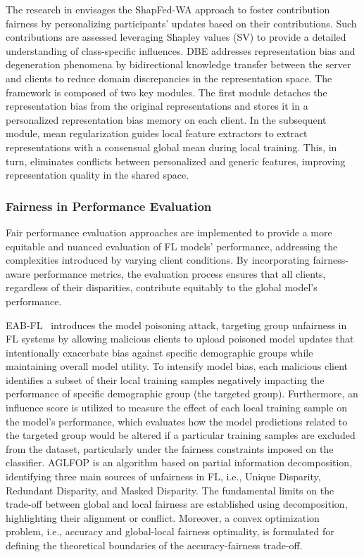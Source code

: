 \documentclass{article}
\begin{document}
The research in \cite{IJCAI_Shapley} envisages the ShapFed-WA approach to foster contribution fairness by personalizing participants' updates based on their contributions. Such contributions are assessed leveraging Shapley values (SV) to provide a detailed understanding of class-specific influences. DBE \cite{NEURIPS2023_2e0d3c6a} addresses representation bias and degeneration phenomena by bidirectional knowledge transfer between the server and clients to reduce domain discrepancies in the representation space. The framework is composed of two key modules. The first module detaches the representation bias from the original representations and stores it in a personalized representation bias memory on each client. In the subsequent module, mean regularization guides local feature extractors to extract representations with a consensual global mean during local training. This, in turn, eliminates conflicts between personalized and generic features, improving representation quality in the shared space.

\subsubsection{Fairness in Performance Evaluation}
\label{Sub_sec: Fairness in Performance Evaluation}
Fair performance evaluation approaches are implemented to provide a more equitable and nuanced evaluation of FL models' performance, addressing the complexities introduced by varying client conditions. By incorporating fairness-aware performance metrics, the evaluation process ensures that all clients, regardless of their disparities, contribute equitably to the global model's performance.

EAB-FL~\cite{ijcai2024_EABFL} introduces the model poisoning attack, targeting group unfairness in FL systems by allowing malicious clients to upload poisoned model updates that intentionally exacerbate bias against specific demographic groups while maintaining overall model utility. To intensify model bias, each malicious client identifies a subset of their local training samples negatively impacting the performance of specific demographic group (the targeted group). Furthermore, an influence score is utilized to measure the effect of each local training sample on the model’s performance, which evaluates how the model predictions related to the targeted group would be altered if a particular training samples are excluded from the dataset, particularly under the fairness constraints imposed on the classifier.
AGLFOP \cite{hamman2024demystifying_ICLR24} 
is an algorithm based on partial information decomposition, identifying three main sources of unfairness in FL, i.e., Unique Disparity, Redundant Disparity, and Masked Disparity. The fundamental limits on the trade-off between global and local fairness 
are established using decomposition, highlighting their alignment or conflict. Moreover, a convex optimization problem, i.e., accuracy and global-local fairness optimality, is formulated for defining the theoretical boundaries of the accuracy-fairness trade-off.
\end{document}
